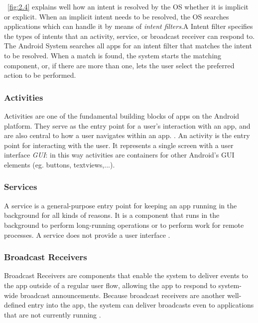 \figurename~\ref{fig:2.4} explains well how an intent is resolved by the OS whether it is implicit or explicit. When an implicit intent needs to be resolved, the OS searches applications which can handle it by means of \textit{intent filters}.A Intent filter specifies the types of intents that an activity, service, or broadcast receiver can respond to. The Android System searches all apps for an intent filter that matches the intent to be resolved. When a match is found, the system starts the matching component, or, if there are more than one, lets the user select the preferred action to be performed.

\subsubsection{Activities} Activities are one of the fundamental building blocks of apps on the Android platform. They serve as the entry point for a user's interaction with an app, and are also central to how a user navigates within an app. \cite{devandroidactivity}. An activity is the entry point for interacting with the user. It represents a single screen with a user interface \textit{GUI}: in this way activities are containers for other Android's GUI elements (eg. buttons, textviews,...).

\subsubsection{Services} A service is a general-purpose entry point for keeping an app running in the background for all kinds of reasons. It is a component that runs in the background to perform long-running operations or to perform work for remote processes. A service does not provide a user interface \cite{devandroifundamentals}. 

\subsubsection{Broadcast Receivers} Broadcast Receivers are components that enable the system to deliver events to the app outside of a regular user flow, allowing the app to respond to system-wide broadcast announcements. Because broadcast receivers are another well-defined entry into the app, the system can deliver broadcasts even to applications that are not currently running \cite{devandroifundamentals}.

